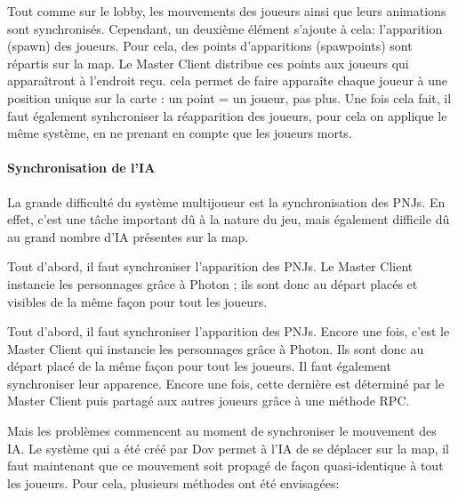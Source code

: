             Tout comme sur le lobby, les mouvements des joueurs ainsi que leurs animations sont synchronisés. Cependant,
            un deuxième élément s'ajoute à cela: l'apparition (spawn) des joueurs. Pour cela, des points d'apparitions (spawpoints)
            sont répartis sur la map. Le Master Client distribue ces points aux joueurs qui apparaîtront à l'endroit reçu. cela permet
            de faire apparaîte chaque joueur à une position unique sur la carte : un point = un joueur, pas plus. Une fois cela fait,
            il faut également synhcroniser la réapparition des joueurs, pour cela on applique le même système, en ne prenant en compte que les joueurs
            morts.


        \paragraph{Synchronisation de l'IA}

            La grande difficulté du système multijoueur est la synchronisation des PNJs. En effet, c'est une tâche important dû à la nature du jeu, 
            mais également difficile dû au grand nombre d'IA présentes sur la map.

            Tout d'abord, il faut synchroniser l'apparition des PNJs. Le Master Client instancie les personnages grâce à Photon ; ils sont donc au départ 
            placés et visibles de la même façon pour tout les joueurs.

            Tout d'abord, il faut synchroniser l'apparition des PNJs. Encore une fois, c'est le Master Client qui instancie les personnages
            grâce à Photon. Ils sont donc au départ placé de la même façon pour tout les joueurs. Il faut également synchroniser leur apparence.
            Encore une fois, cette dernière est déterminé par le Master Client puis partagé aux autres joueurs grâce à une méthode RPC.

            Mais les problèmes commencent au moment de synchroniser le mouvement des IA. Le système qui a été créé par Dov permet
            à l'IA de se déplacer sur la map, il faut maintenant que ce mouvement soit propagé de façon quasi-identique à tout les joueurs.
            Pour cela, plusieurs méthodes ont été envisagées:

